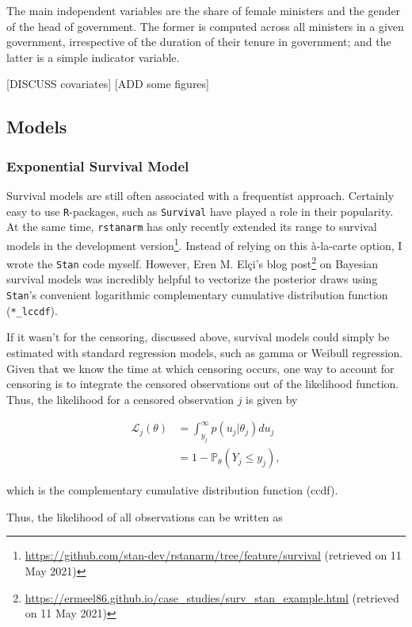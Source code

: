 \documentclass[11pt]{article}
\begin{document}
The main independent variables are the share of female ministers and the gender of the head of government. The former is computed across all ministers in a given government, irrespective of the duration of their tenure in government; and the latter is a simple indicator variable. 

[DISCUSS covariates]
[ADD some figures]

\subsection{Models}
\subsubsection{Exponential Survival Model}
Survival models are still often associated with a frequentist approach. Certainly easy to use \texttt{R}-packages, such as \texttt{Survival} \parencite{Rsurvival2020} have played a role in their popularity. At the same time, \texttt{rstanarm} \parencite{rstanarm2020} has only recently extended its range to survival models in the development version\footnote{\url{https://github.com/stan-dev/rstanarm/tree/feature/survival} (retrieved on 11 May 2021)}. Instead of relying on this à-la-carte option, I wrote the \texttt{Stan} code myself. However, Eren M. Elçi's blog post\footnote{\url{https://ermeel86.github.io/case_studies/surv_stan_example.html} (retrieved on 11 May 2021)} on Bayesian survival models was incredibly helpful to vectorize the posterior draws using \texttt{Stan}'s convenient logarithmic complementary cumulative distribution function (\texttt{*\_lccdf}).

If it wasn't for the censoring, discussed above, survival models could simply be estimated with standard regression models, such as gamma or Weibull regression. Given that we know the time at which censoring occurs, one way to account for censoring is to integrate the censored observations out of the likelihood function. Thus, the likelihood for a censored observation $j$ is given by 

\begin{align*}
\mathcal{L}_j (\theta) &= \int_{y_j}^{\infty} p(u_j|\theta_j) du_j \\
&= 1-\mathbb{P}_\theta(Y_j \leq y_j),
\end{align*}

which is the complementary cumulative distribution function (ccdf).

Thus, the likelihood of all observations can be written as 
\end{document}
